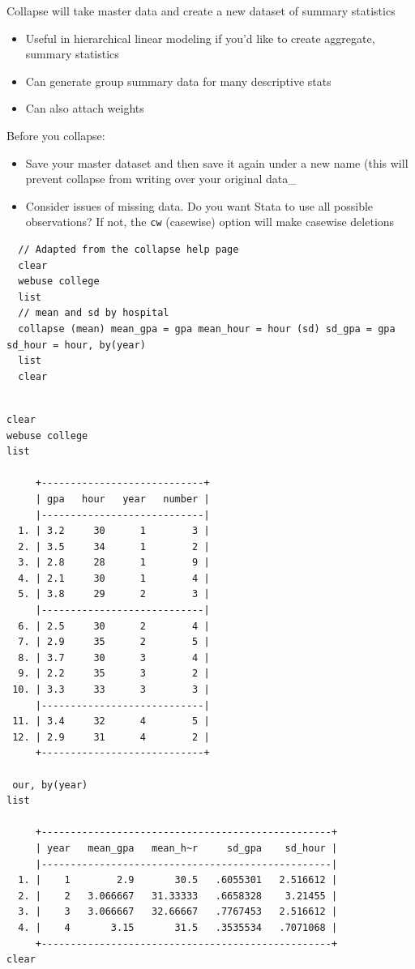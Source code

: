 \documentclass[]{book}
\providecommand{\tightlist}{%
  \setlength{\itemsep}{0pt}\setlength{\parskip}{0pt}}
\begin{document}
Collapse will take master data and create a new dataset of summary
statistics

\begin{itemize}
\tightlist
\item
  Useful in hierarchical linear modeling if you'd like to create
  aggregate, summary statistics
\item
  Can generate group summary data for many descriptive stats
\item
  Can also attach weights
\end{itemize}

Before you collapse:

\begin{itemize}
\tightlist
\item
  Save your master dataset and then save it again under a new name (this
  will prevent collapse from writing over your original data\_
\item
  Consider issues of missing data. Do you want Stata to use all possible
  observations? If not, the \texttt{cw} (casewise) option will make
  casewise deletions
\end{itemize}

\begin{verbatim}
  // Adapted from the collapse help page
  clear
  webuse college
  list
  // mean and sd by hospital
  collapse (mean) mean_gpa = gpa mean_hour = hour (sd) sd_gpa = gpa sd_hour = hour, by(year)
  list
  clear
\end{verbatim}

\begin{verbatim}

clear
webuse college
list

     +----------------------------+
     | gpa   hour   year   number |
     |----------------------------|
  1. | 3.2     30      1        3 |
  2. | 3.5     34      1        2 |
  3. | 2.8     28      1        9 |
  4. | 2.1     30      1        4 |
  5. | 3.8     29      2        3 |
     |----------------------------|
  6. | 2.5     30      2        4 |
  7. | 2.9     35      2        5 |
  8. | 3.7     30      3        4 |
  9. | 2.2     35      3        2 |
 10. | 3.3     33      3        3 |
     |----------------------------|
 11. | 3.4     32      4        5 |
 12. | 2.9     31      4        2 |
     +----------------------------+

 our, by(year)
list

     +--------------------------------------------------+
     | year   mean_gpa   mean_h~r     sd_gpa    sd_hour |
     |--------------------------------------------------|
  1. |    1        2.9       30.5   .6055301   2.516612 |
  2. |    2   3.066667   31.33333   .6658328    3.21455 |
  3. |    3   3.066667   32.66667   .7767453   2.516612 |
  4. |    4       3.15       31.5   .3535534   .7071068 |
     +--------------------------------------------------+
clear
\end{verbatim}
\end{document}
